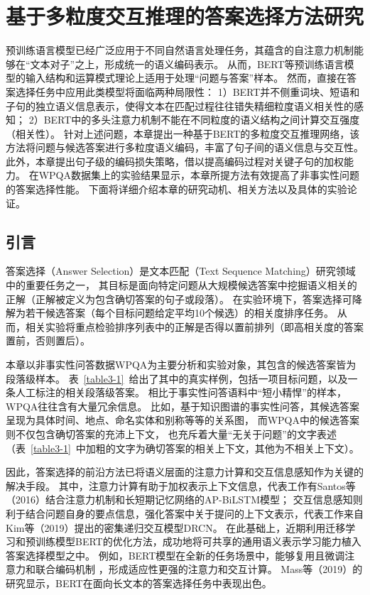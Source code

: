 \chapter{基于多粒度交互推理的答案选择方法研究}

预训练语言模型已经广泛应用于不同自然语言处理任务，其蕴含的自注意力机制能够在“文本对子”之上，形成统一的语义编码表示。
从而，BERT等预训练语言模型的输入结构和运算模式理论上适用于处理“问题与答案”样本。
然而，直接在答案选择任务中应用此类模型将面临两种局限性：
1）BERT并不侧重词块、短语和子句的独立语义信息表示，使得文本在匹配过程往往错失精细粒度语义相关性的感知；
2）BERT中的多头注意力机制不能在不同粒度的语义结构之间计算交互强度（相关性）。
针对上述问题，本章提出一种基于BERT的多粒度交互推理网络，该方法将问题与候选答案进行多粒度语义编码，丰富了句子间的语义信息与交互性。
此外，本章提出句子级的编码损失策略，借以提高编码过程对关键子句的加权能力。
在WPQA数据集上的实验结果显示，本章所提方法有效提高了非事实性问题的答案选择性能。
下面将详细介绍本章的研究动机、相关方法以及具体的实验论证。

\section{引言}

答案选择（Answer Selection）是文本匹配（Text Sequence Matching）研究领域中的重要任务之一，
其目标是面向特定问题从大规模候选答案中挖掘语义相关的正解（正解被定义为包含确切答案的句子或段落）。
在实验环境下，答案选择可降解为若干候选答案（每个目标问题给定平均10个候选）的相关度排序任务。
从而，相关实验将重点检验排序列表中的正解是否得以置前排列（即高相关度的答案置前，否则置后）。

本章以非事实性问答数据WPQA\cite{cohen2018wikipassageqa}为主要分析和实验对象，其包含的候选答案皆为段落级样本。
表~\ref{table3-1}~给出了其中的真实样例，包括一项目标问题，以及一条人工标注的相关段落级答案。
相比于事实性问答语料中“短小精悍”的样本，WPQA往往含有大量冗余信息。
比如，基于知识图谱的事实性问答，其候选答案呈现为具体时间、地点、命名实体和别称等等的关系图，
而WPQA中的候选答案则不仅包含确切答案的充沛上下文，
也充斥着大量“无关于问题”的文字表述（表~\ref{table3-1}~中加粗的文字为确切答案的相关上下文，其他为不相关上下文）。



因此，答案选择的前沿方法已将语义层面的注意力计算和交互信息感知作为关键的解决手段。
其中，注意力计算有助于加权表示上下文信息，代表工作有Santos等（2016）\cite{santos2016attentive}结合注意力机制和长短期记忆网络的AP-BiLSTM模型；
交互信息感知则利于结合问题自身的要点信息，强化答案中关于提问的上下文表示，代表工作来自Kim等（2019）\cite{kim2019semantic}提出的密集递归交互模型DRCN。
在此基础上，近期利用迁移学习和预训练模型BERT的优化方法，成功地将可共享的通用语义表示学习能力植入答案选择模型之中。
例如，BERT\cite{devlin2018bert}模型在全新的任务场景中，能够复用且微调注意力和联合编码机制
，形成适应性更强的注意力和交互计算。
Mass等（2019）\cite{mass2019study}的研究显示，BERT在面向长文本的答案选择任务中表现出色。

